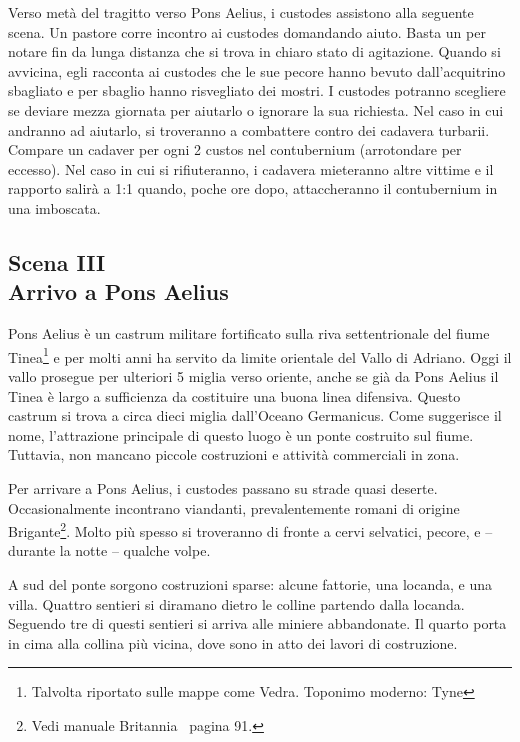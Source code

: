\documentclass[11.5pt,twocolumn]{article}
\begin{document}
Verso met\`{a} del tragitto verso Pons Aelius, i custodes assistono alla seguente scena.
Un pastore corre incontro ai custodes domandando aiuto.
Basta un  per notare fin da lunga distanza che si trova in chiaro stato di agitazione.
Quando si avvicina, egli racconta ai custodes che le sue pecore hanno bevuto dall'acquitrino sbagliato e per sbaglio hanno risvegliato dei mostri.
I custodes potranno scegliere se deviare mezza giornata per aiutarlo o ignorare la sua richiesta.
Nel caso in cui andranno ad aiutarlo, si troveranno a combattere contro dei cadavera turbarii.
Compare un cadaver per ogni 2 custos nel contubernium (arrotondare per eccesso).
Nel caso in cui si rifiuteranno, i cadavera mieteranno altre vittime e il rapporto salir\`{a} a 1:1 quando, poche ore dopo, attaccheranno il contubernium in una imboscata.

\subsection*{Scena III\\Arrivo a Pons Aelius}
%
Pons Aelius \`{e} un castrum militare fortificato sulla riva settentrionale del fiume Tinea\footnote{Talvolta riportato sulle mappe come Vedra. Toponimo moderno: Tyne} e per molti anni ha servito da limite orientale del Vallo di Adriano.
Oggi il vallo prosegue per ulteriori 5 miglia verso oriente, anche se gi\`{a} da Pons Aelius il Tinea \`{e} largo a sufficienza da costituire una buona linea difensiva.
Questo castrum si trova a circa dieci miglia dall'Oceano Germanicus.
Come suggerisce il nome, l'attrazione principale di questo luogo \`{e} un ponte costruito sul fiume.
Tuttavia, non mancano piccole costruzioni e attivit\`{a} commerciali in zona.

Per arrivare a Pons Aelius, i custodes passano su strade quasi deserte.
Occasionalmente incontrano viandanti, prevalentemente romani di origine Brigante\footnote{Vedi manuale Britannia~\cite{britannia_en} pagina 91.}.
Molto pi\`{u} spesso si troveranno di fronte a cervi selvatici, pecore, e -- durante la notte -- qualche volpe.

A sud del ponte sorgono costruzioni sparse: alcune fattorie, una locanda, e una villa.
Quattro sentieri si diramano dietro le colline partendo dalla locanda.
Seguendo tre di questi sentieri si arriva alle miniere abbandonate.
Il quarto porta in cima alla collina pi\`{u} vicina, dove sono in atto dei lavori di costruzione.
\end{document}

